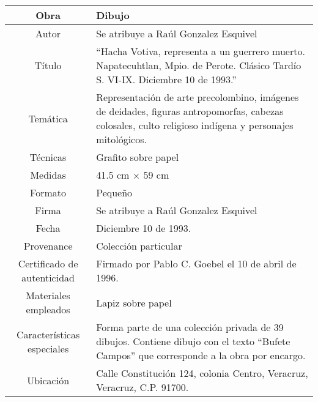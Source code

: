 \documentclass[10pt,letter]{report}
\begin{document}
\begin{table}[H]
\centering
\begin{tabular}{|c|m{}|}
\hline
Obra& Dibujo	\\
\hline
Autor & Se atribuye a Ra\'ul Gonzalez Esquivel\\
\hline
T\'itulo & ``Hacha Votiva, representa a un guerrero muerto. Napatecuhtlan, Mpio. de Perote. Cl\'asico Tard\'io S. VI-IX. Diciembre 10 de 1993.'' \\
\hline
Tem\'atica & Representaci\'on de arte precolombino, im\'agenes de deidades, figuras antropomorfas, cabezas colosales, culto religioso ind\'igena y personajes mitol\'ogicos.\\
\hline
T\'ecnicas &Grafito sobre papel \\
\hline
Medidas & 41.5 cm $\times$ 59 cm \\
\hline
 Formato & Peque\~no \\
 \hline
 Firma & Se atribuye a Ra\'ul Gonzalez Esquivel\\ 
 \hline
  Fecha & Diciembre 10 de 1993.\\
 \hline
 Provenance & Colecci\'on particular\\
 \hline
 Certificado de autenticidad& Firmado por Pablo C. Goebel el 10 de abril de 1996.  \\
 \hline 
  Materiales empleados & Lapiz sobre papel\\
 \hline
 Caracter\'isticas especiales & Forma parte de una colecci\'on privada de 39 dibujos. 
Contiene dibujo con el texto ``Bufete Campos'' que corresponde a la obra por encargo. \\
\hline 
Ubicaci\'on & Calle Constituci\'on 124, colonia Centro, Veracruz, Veracruz, C.P. 91700.\\
\hline

\end{tabular}
\end{table}
\end{document}
